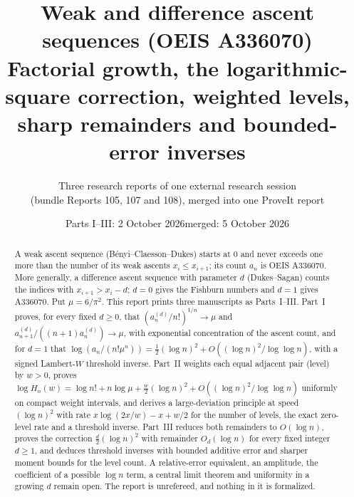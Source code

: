 \documentclass[11pt,a4paper]{article}
\title{\textbf{Weak and difference ascent sequences (OEIS A336070)}\\[7pt]
\large Factorial growth, the logarithmic-square correction, weighted levels,\\ sharp remainders and bounded-error inverses}
\author{Three research reports of one external research session\\(bundle Reports 105, 107 and 108), merged into one ProveIt report}
\date{Parts I--III: 2 October 2026\quad merged: 5 October 2026}
\theoremstyle{remark}\newtheorem{remark}[theorem]{Remark}
\numberwithin{equation}{section}
\begin{document}
\hypersetup{pageanchor=false}
\maketitle
\begin{abstract}
A weak ascent sequence (B\'enyi--Claesson--Dukes) starts at $0$ and never exceeds one more than the number of its weak ascents $x_i\le x_{i+1}$; its count $a_n$ is OEIS A336070. More generally, a difference ascent sequence with parameter $d$ (Dukes--Sagan) counts the indices with $x_{i+1}>x_i-d$; $d=0$ gives the Fishburn numbers and $d=1$ gives A336070. Put $\mu=6/\pi^2$. This report prints three manuscripts as Parts~I--III. Part~I proves, for every fixed $d\ge0$, that $(a_n^{(d)}/n!)^{1/n}\to\mu$ and $a^{(d)}_{n+1}/((n+1)a^{(d)}_n)\to\mu$, with exponential concentration of the ascent count, and for $d=1$ that $\log(a_n/(n!\mu^n))=\frac12(\log n)^2+O((\log n)^2/\log\log n)$, with a signed Lambert-$W$ threshold inverse. Part~II weights each equal adjacent pair (level) by $w>0$, proves $\log H_n(w)=\log n!+n\log\mu+\frac w2(\log n)^2+O((\log n)^2/\log\log n)$ uniformly on compact weight intervals, and derives a large-deviation principle at speed $(\log n)^2$ with rate $x\log(2x/w)-x+w/2$ for the number of levels, the exact zero-level rate and a threshold inverse. Part~III reduces both remainders to $O(\log n)$, proves the correction $\frac d2(\log n)^2$ with remainder $O_d(\log n)$ for every fixed integer $d\ge1$, and deduces threshold inverses with bounded additive error and sharper moment bounds for the level count. A relative-error equivalent, an amplitude, the coefficient of a possible $\log n$ term, a central limit theorem and uniformity in a growing $d$ remain open. The report is unrefereed, and nothing in it is formalized.
\end{abstract}
\hypersetup{pageanchor=true}
\setcounter{tocdepth}{1}
\tableofcontents
\newpage
\end{document}
